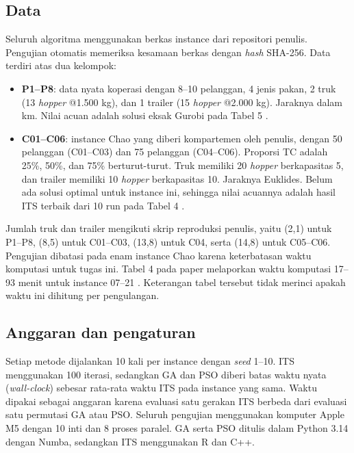 \documentclass[conference]{IEEEtran}
\begin{document}
\subsection{Data}

Seluruh algoritma menggunakan berkas instance dari repositori penulis. Pengujian otomatis memeriksa kesamaan berkas dengan \textit{hash} SHA-256. Data terdiri atas dua kelompok:
\begin{itemize}
\item \textbf{P1--P8}: data nyata koperasi dengan 8--10 pelanggan, 4 jenis pakan, 2 truk (13 \textit{hopper} @1.500 kg), dan 1 trailer (15 \textit{hopper} @2.000 kg). Jaraknya dalam km. Nilai acuan adalah solusi eksak Gurobi pada Tabel 5 \cite{davila2023}.
\item \textbf{C01--C06}: instance Chao \cite{chao2002} yang diberi kompartemen oleh penulis, dengan 50 pelanggan (C01--C03) dan 75 pelanggan (C04--C06). Proporsi TC adalah 25\%, 50\%, dan 75\% berturut-turut. Truk memiliki 20 \textit{hopper} berkapasitas 5, dan trailer memiliki 10 \textit{hopper} berkapasitas 10. Jaraknya Euklides. Belum ada solusi optimal untuk instance ini, sehingga nilai acuannya adalah hasil ITS terbaik dari 10 run pada Tabel 4 \cite{davila2023}.
\end{itemize}
Jumlah truk dan trailer mengikuti skrip reproduksi penulis, yaitu (2,1) untuk P1--P8, (8,5) untuk C01--C03, (13,8) untuk C04, serta (14,8) untuk C05--C06. Pengujian dibatasi pada enam instance Chao karena keterbatasan waktu komputasi untuk tugas ini. Tabel 4 pada paper melaporkan waktu komputasi 17--93 menit untuk instance 07--21 \cite{davila2023}. Keterangan tabel tersebut tidak merinci apakah waktu ini dihitung per pengulangan.

\subsection{Anggaran dan pengaturan}

Setiap metode dijalankan 10 kali per instance dengan \textit{seed} 1--10. ITS menggunakan 100 iterasi, sedangkan GA dan PSO diberi batas waktu nyata (\textit{wall-clock}) sebesar rata-rata waktu ITS pada instance yang sama. Waktu dipakai sebagai anggaran karena evaluasi satu gerakan ITS berbeda dari evaluasi satu permutasi GA atau PSO. Seluruh pengujian menggunakan komputer Apple M5 dengan 10 inti dan 8 proses paralel. GA serta PSO ditulis dalam Python 3.14 dengan Numba, sedangkan ITS menggunakan R dan C++.
\end{document}
